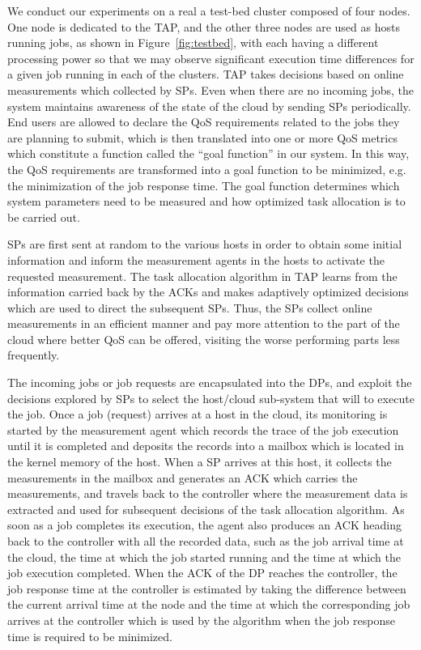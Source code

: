 \documentclass[journal]{IEEEtran}
\begin{document}
We conduct our experiments on a real a test-bed cluster composed of four nodes. One node is dedicated to the TAP, and the other three nodes are used as hosts running jobs, as shown in Figure~\ref{fig:testbed},
with each having a different processing power so that we may observe significant execution time differences for a given job running in each of the clusters. 
TAP takes decisions based on online measurements which collected by SPs. Even when there are no incoming jobs, the system maintains awareness of the state of the cloud by sending SPs periodically. End users are allowed to declare the QoS requirements related to the jobs they are planning to submit, which is then translated into one or more QoS metrics which constitute a function called the ``goal function'' in our system. In this way, the QoS requirements are transformed into a goal function to be minimized, e.g. the minimization of the job response time. The goal function determines which system parameters need to be measured and how optimized task allocation is to be carried out. 

SPs are first sent at random to the various hosts in order to obtain some initial information and inform the measurement agents in the hosts to activate the requested measurement. The task allocation algorithm in TAP learns from the information carried back by the ACKs and makes adaptively optimized decisions which are used to direct the subsequent SPs. Thus, the SPs collect online measurements in an efficient manner and pay more attention to the part of the cloud where better QoS can be offered, visiting the worse performing parts less frequently. 

The incoming jobs or job requests are encapsulated into the DPs, and exploit the decisions explored by SPs to select the host/cloud sub-system that will to execute the job. Once a job (request) arrives at a host in the cloud, its monitoring is started by the measurement agent which records the trace of the job execution until it is completed and deposits the records into a mailbox which is located in the kernel memory of the host. When a SP arrives at this host, it collects the measurements in the mailbox and generates an ACK which carries the measurements, and travels back to the controller where the measurement data is extracted and used for subsequent decisions of the task allocation algorithm. As soon as a job completes its execution, the agent also produces an ACK heading back to the controller with all the recorded data, such as the job arrival time at the cloud, the time at which the job started running and the time at which the job execution completed. When the ACK of the DP reaches the controller, the job response time at the controller is estimated by taking the difference between the current arrival time at the node and the time at which the corresponding job arrives at the controller which is used by the algorithm when the job response time is required to be minimized. 
\end{document}
